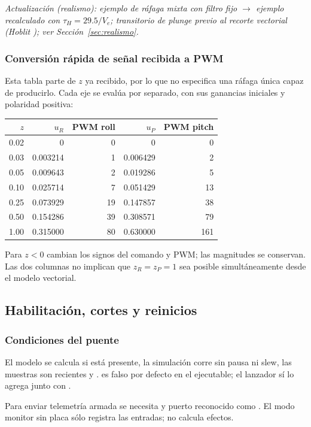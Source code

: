 \textit{Actualización (realismo): ejemplo de ráfaga mixta con filtro fijo $\rightarrow$ ejemplo recalculado con $\tau_H=29.5/V_e$; transitorio de plunge previo al recorte vectorial (Hoblit \cite{hoblit1988}); ver Sección~\ref{sec:realismo}.}

\subsubsection{Conversión rápida de señal recibida a PWM}
Esta tabla parte de $z$ ya recibido, por lo que no especifica una ráfaga única capaz de producirlo. Cada eje se evalúa por separado, con sus ganancias iniciales y polaridad positiva:
\begin{center}
\begin{tabular}{rrrrr}
\toprule
$z$ & $u_R$ & PWM roll & $u_P$ & PWM pitch\\
\midrule
0.02 & 0 & 0 & 0 & 0\\
0.03 & 0.003214 & 1 & 0.006429 & 2\\
0.05 & 0.009643 & 2 & 0.019286 & 5\\
0.10 & 0.025714 & 7 & 0.051429 & 13\\
0.25 & 0.073929 & 19 & 0.147857 & 38\\
0.50 & 0.154286 & 39 & 0.308571 & 79\\
1.00 & 0.315000 & 80 & 0.630000 & 161\\
\bottomrule
\end{tabular}
\end{center}
Para $z<0$ cambian los signos del comando y PWM; las magnitudes se conservan. Las dos columnas no implican que $z_R=z_P=1$ sea posible simultáneamente desde el modelo vectorial.

\subsection{Habilitación, cortes y reinicios}
\subsubsection{Condiciones del puente}
El modelo se calcula si  está presente, la simulación corre sin pausa ni slew, las muestras son recientes y .  es falso por defecto en el ejecutable; el lanzador  sí lo agrega junto con .

Para enviar telemetría armada se necesita  y puerto reconocido como . El modo monitor sin placa sólo registra las entradas; no calcula efectos.

